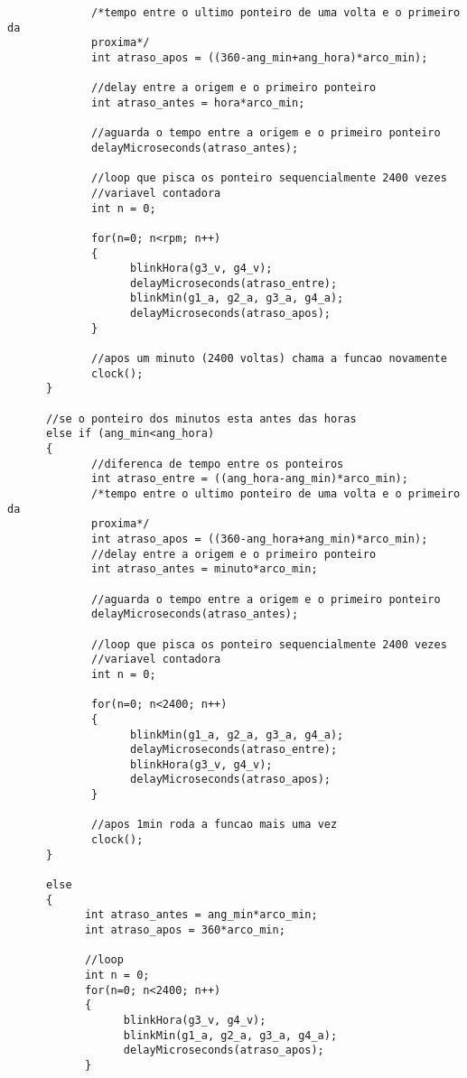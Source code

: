 \begin{lstlisting}
             /*tempo entre o ultimo ponteiro de uma volta e o primeiro da
             proxima*/
             int atraso_apos = ((360-ang_min+ang_hora)*arco_min);

             //delay entre a origem e o primeiro ponteiro
             int atraso_antes = hora*arco_min;

             //aguarda o tempo entre a origem e o primeiro ponteiro
             delayMicroseconds(atraso_antes);

             //loop que pisca os ponteiro sequencialmente 2400 vezes
             //variavel contadora
             int n = 0;

             for(n=0; n<rpm; n++)
             {
                   blinkHora(g3_v, g4_v);
                   delayMicroseconds(atraso_entre);
                   blinkMin(g1_a, g2_a, g3_a, g4_a);
                   delayMicroseconds(atraso_apos);
             }

             //apos um minuto (2400 voltas) chama a funcao novamente
             clock();
      }

      //se o ponteiro dos minutos esta antes das horas
      else if (ang_min<ang_hora)
      {
             //diferenca de tempo entre os ponteiros
             int atraso_entre = ((ang_hora-ang_min)*arco_min);
             /*tempo entre o ultimo ponteiro de uma volta e o primeiro da
             proxima*/
             int atraso_apos = ((360-ang_hora+ang_min)*arco_min);
             //delay entre a origem e o primeiro ponteiro
             int atraso_antes = minuto*arco_min;

             //aguarda o tempo entre a origem e o primeiro ponteiro
             delayMicroseconds(atraso_antes);

             //loop que pisca os ponteiro sequencialmente 2400 vezes
             //variavel contadora
             int n = 0;

             for(n=0; n<2400; n++)
             {
                   blinkMin(g1_a, g2_a, g3_a, g4_a);
                   delayMicroseconds(atraso_entre);
                   blinkHora(g3_v, g4_v);
                   delayMicroseconds(atraso_apos);
             }

             //apos 1min roda a funcao mais uma vez
             clock();
      }

      else
      {
            int atraso_antes = ang_min*arco_min;
            int atraso_apos = 360*arco_min;

            //loop
            int n = 0;
            for(n=0; n<2400; n++)
            {
                  blinkHora(g3_v, g4_v);
                  blinkMin(g1_a, g2_a, g3_a, g4_a);
                  delayMicroseconds(atraso_apos);
            }


\end{lstlisting}
